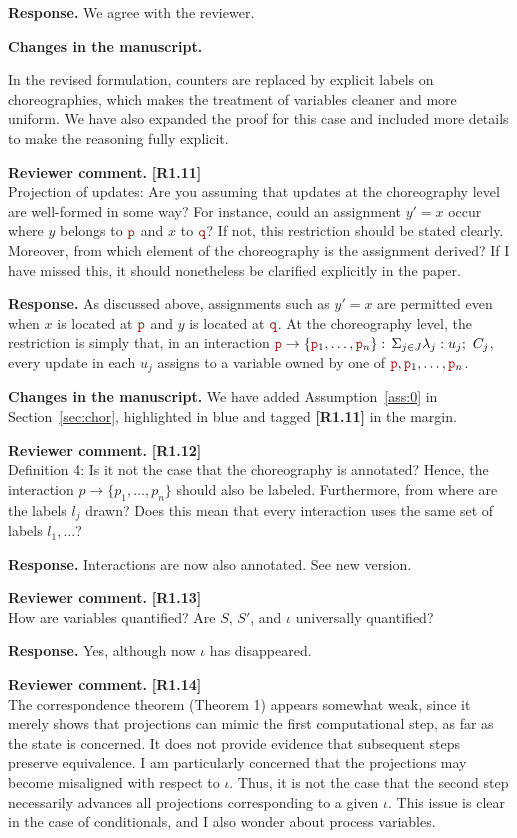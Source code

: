 \documentclass[11pt]{article}
\newcommand{\role}[1]{\textcolor{bloodyred}{\mathtt{#1}}}
\newcommand{\nr}{\role p}
\newcommand{\nrr}{\role q}
\newcommand{\interactBase}[2]{{#1}\rightarrow \{{#2}\}}
\newcommand{\interact}[2]{\interactBase{#1}{#2}:\,\Sigma_{j\in J}\lambda_j: u_j;\ C_j}
\newcommand{\revcomment}[1]{%
  \begin{reviewercomment}
  \textbf{Reviewer comment.} #1
  \end{reviewercomment}
}
\newcommand{\revresponse}[2][]{%
  \par\noindent\textbf{Response.} #1 #2
}
\newcommand{\revchanges}[2][]{%
  \par\noindent\textbf{Changes in the manuscript.} #1
  #2\par\bigskip
}
\begin{document}
\revresponse{
We agree with the reviewer. }

\revchanges{
In the revised formulation, counters are replaced by
explicit labels on choreographies, which makes the treatment of variables cleaner and more uniform. We have also expanded the proof for this case and
included more details to make the reasoning fully explicit.
}


\revcomment{\textbf{[R1.11]}\\
Projection of updates: Are you assuming that updates at the
choreography level are well-formed in some way? For instance, could
an assignment $y' = x$ occur where $y$ belongs to $\nr$ and $x$ to
$\nrr$? If not, this restriction should be stated clearly. Moreover,
from which element of the choreography is the assignment derived? If
I have missed this, it should nonetheless be clarified explicitly in
the paper.
}

\revresponse{
As discussed above, assignments such as $y' = x$ are permitted even when $x$ is located at $\nr$ and $y$ is located at $\nrr$. At the choreography level, the restriction is simply that, in an interaction $\interact{\nr}{\nr_1,\ldots,\nr_n}$, every update in each $u_j$ assigns to a variable owned by one of $\nr, \nr_1,\ldots,\nr_n$.
}
\revchanges{ We have added Assumption~\ref{ass:0} in
  Section~\ref{sec:chor}, highlighted in blue and tagged
  \textbf{[R1.11]} in the margin.}

\revcomment{\textbf{[R1.12]}\\
Definition 4: Is it not the case that the choreography is annotated?
Hence, the interaction $p \rightarrow \{p_1,\ldots,p_n\}$ should
also be labeled. Furthermore, from where are the labels $l_j$
drawn? Does this mean that every interaction uses the same set of
labels $l_1, \ldots$?
}

\revresponse{ Interactions are now also annotated. See new version.  }


\revcomment{\textbf{[R1.13]}\\
How are variables quantified? Are $S$, $S'$, and $\iota$ universally
quantified?
}

\revresponse{
  Yes, although now $\iota$ has disappeared.
}

\revcomment{\textbf{[R1.14]}\\
The correspondence theorem (Theorem 1) appears somewhat weak, since
it merely shows that projections can mimic the first computational
step, as far as the state is concerned. It does not provide evidence
that subsequent steps preserve equivalence. I am particularly
concerned that the projections may become misaligned with respect to
$\iota$. Thus, it is not the case that the second step necessarily
advances all projections corresponding to a given $\iota$. This
issue is clear in the case of conditionals, and I also wonder about
process variables.
}
\end{document}
